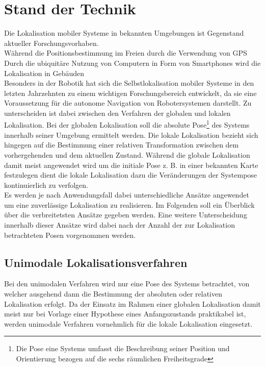 \chapter{Stand der Technik}
\label{chap:tech}
Die Lokalisation mobiler Systeme in bekannten Umgebungen ist Gegenstand aktueller Forschungsvorhaben.\\
Während die Positionsbestimmung im Freien durch die Verwendung von GPS \\
Durch die ubiquitäre Nutzung von Computern in Form von Smartphones wird die Lokalisation in Gebäuden\\
Besonders in der Robotik hat sich die Selbstlokalisation mobiler Systeme in den letzten Jahrzehnten zu einem wichtigen Forschungsbereich entwickelt, da sie eine Voraussetzung für die autonome Navigation von Robotersystemen darstellt.  Zu unterscheiden ist dabei zwischen den Verfahren der globalen und lokalen Lokalisation. Bei der globalen Lokalisation soll die absolute Pose\footnote{Die Pose eine Systems umfasst die Beschreibung seiner Position und Orientierung bezogen auf die sechs räumlichen Freiheitsgrade } des Systems innerhalb seiner Umgebung ermittelt werden. Die lokale Lokalisation bezieht sich hingegen auf die Bestimmung einer relativen Transformation zwischen dem vorhergehenden und dem aktuellen Zustand. Während die globale Lokalisation damit meist angewendet wird um die initiale Pose z. B. in einer bekannten Karte festzulegen dient die lokale Lokalisation dazu die Veränderungen der Systempose kontinuierlich zu verfolgen.\\
Es werden je nach Anwendungsfall dabei unterschiedliche Ansätze angewendet um eine zuverlässige Lokalisation zu realisieren. Im Folgenden soll ein Überblick über die verbreitetsten Ansätze gegeben werden. Eine weitere Unterscheidung innerhalb dieser Ansätze wird dabei nach der Anzahl der zur Lokalisation betrachteten Posen vorgenommen werden. 
\section{Unimodale Lokalisationsverfahren}
Bei den unimodalen Verfahren wird nur eine Pose des Systems betrachtet, von welcher ausgehend dann die Bestimmung der absoluten oder relativen Lokalisation erfolgt. Da der Einsatz im Rahmen einer globalen Lokalisation damit meist nur bei Vorlage einer \red[(sinnvollen)] Hypothese eines Anfangszustands praktikabel ist, werden unimodale Verfahren vornehmlich für die lokale Lokalisation eingesetzt. 

